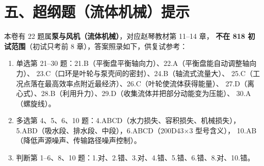 \section*{五、超纲题（流体机械）提示}

本卷有 22 题属\textbf{泵与风机（流体机械）}，对应赵琴教材第 11--14 章，
\textbf{不在 818 初试范围}（初试只考前 8 章），答案照录如下，供复试参考：
\begin{enumerate}
  \item 单选第 21--30 题：21.B（平衡盘平衡轴向力）、22.A（平衡盘能自动调整轴向力）、
        23.C（口环是叶轮与泵壳间的密封）、24.B（轴流式流量大）、
        25.C（工况点落在最高效率点附近最经济）、26.C（叶轮使流体获得能量）、
        27.D（离心式）、28.B（利用升力）、29.D（收集流体并把部分动能变为压能）、
        30.A（螺旋线）。
  \item 多选第 4、5、6、10 题：4.ABCD（水力损失、容积损失、机械损失），
        5.ABD（吸水段、排水段、中段），6.ABCD（200D43$\times$3 型号含义），
        10.AB（降低声源噪声、传输路径噪声控制）。
  \item 判断第 1--6、8、10 题：1.对、2.错、3.对、4.错、5.错、6.错、8.对、10.错。
\end{enumerate}
